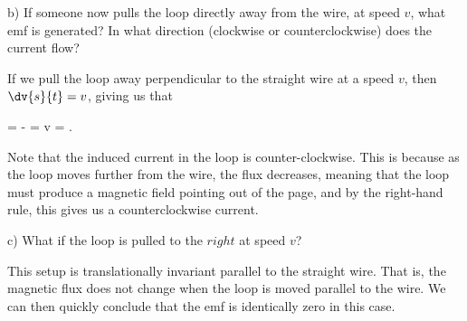 \documentclass[12pt,a4paper]{article}
\begin{document}
b) If someone now pulls the loop directly away from the wire, at speed $v$, what emf is generated?
In what direction (clockwise or counterclockwise) does the current flow?

If we pull the loop away perpendicular to the straight wire at a speed $v$, then $\dv{s}{t} = v$, giving us that 
\begin{eqbox}
     = - =  v  = 
.\end{eqbox}

Note that the induced current in the loop is counter-clockwise.
This is because as the loop moves further from the wire, the flux decreases, meaning that the loop must produce a magnetic field pointing out of the page, and by the right-hand rule, this gives us a counterclockwise current.

c) What if the loop is pulled to the $right$ at speed $v$?

This setup is translationally invariant parallel to the straight wire.
That is, the magnetic flux does not change when the loop is moved parallel to the wire.
We can then quickly conclude that the emf is identically zero in this case.
\end{document}
